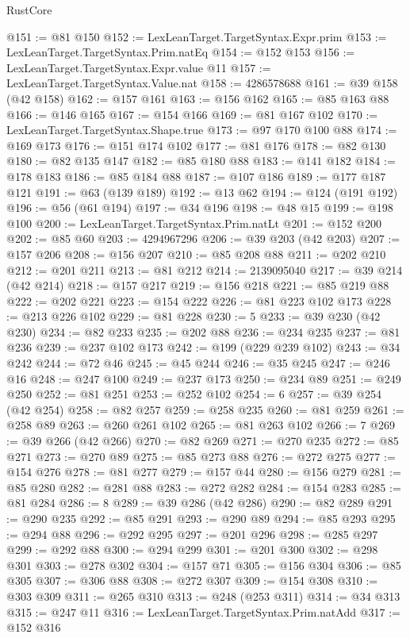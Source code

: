\begin{lexlean}{RustCore}
\begin{coremodule}
@151 := @81 @150
@152 := LexLeanTarget.TargetSyntax.Expr.prim
@153 := LexLeanTarget.TargetSyntax.Prim.natEq
@154 := @152 @153
@156 := LexLeanTarget.TargetSyntax.Expr.value @11
@157 := LexLeanTarget.TargetSyntax.Value.nat
@158 := 4286578688
@161 := @39 @158 (@42 @158)
@162 := @157 @161
@163 := @156 @162
@165 := @85 @163 @88
@166 := @146 @165
@167 := @154 @166
@169 := @81 @167 @102
@170 := LexLeanTarget.TargetSyntax.Shape.true
@173 := @97 @170 @100 @88
@174 := @169 @173
@176 := @151 @174 @102
@177 := @81 @176
@178 := @82 @130
@180 := @82 @135 @147
@182 := @85 @180 @88
@183 := @141 @182
@184 := @178 @183
@186 := @85 @184 @88
@187 := @107 @186
@189 := @177 @187 @121
@191 := @63 (@139 @189)
@192 := @13 @62
@194 := @124 (@191 @192)
@196 := @56 (@61 @194)
@197 := @34 @196
@198 := @48 @15
@199 := @198 @100
@200 := LexLeanTarget.TargetSyntax.Prim.natLt
@201 := @152 @200
@202 := @85 @60
@203 := 4294967296
@206 := @39 @203 (@42 @203)
@207 := @157 @206
@208 := @156 @207
@210 := @85 @208 @88
@211 := @202 @210
@212 := @201 @211
@213 := @81 @212
@214 := 2139095040
@217 := @39 @214 (@42 @214)
@218 := @157 @217
@219 := @156 @218
@221 := @85 @219 @88
@222 := @202 @221
@223 := @154 @222
@226 := @81 @223 @102 @173
@228 := @213 @226 @102
@229 := @81 @228
@230 := 5
@233 := @39 @230 (@42 @230)
@234 := @82 @233
@235 := @202 @88
@236 := @234 @235
@237 := @81 @236
@239 := @237 @102 @173
@242 := @199 (@229 @239 @102)
@243 := @34 @242
@244 := @72 @46
@245 := @45 @244
@246 := @35 @245
@247 := @246 @16
@248 := @247 @100
@249 := @237 @173
@250 := @234 @89
@251 := @249 @250
@252 := @81 @251
@253 := @252 @102
@254 := 6
@257 := @39 @254 (@42 @254)
@258 := @82 @257
@259 := @258 @235
@260 := @81 @259
@261 := @258 @89
@263 := @260 @261 @102
@265 := @81 @263 @102
@266 := 7
@269 := @39 @266 (@42 @266)
@270 := @82 @269
@271 := @270 @235
@272 := @85 @271
@273 := @270 @89
@275 := @85 @273 @88
@276 := @272 @275
@277 := @154 @276
@278 := @81 @277
@279 := @157 @44
@280 := @156 @279
@281 := @85 @280
@282 := @281 @88
@283 := @272 @282
@284 := @154 @283
@285 := @81 @284
@286 := 8
@289 := @39 @286 (@42 @286)
@290 := @82 @289
@291 := @290 @235
@292 := @85 @291
@293 := @290 @89
@294 := @85 @293
@295 := @294 @88
@296 := @292 @295
@297 := @201 @296
@298 := @285 @297
@299 := @292 @88
@300 := @294 @299
@301 := @201 @300
@302 := @298 @301
@303 := @278 @302
@304 := @157 @71
@305 := @156 @304
@306 := @85 @305
@307 := @306 @88
@308 := @272 @307
@309 := @154 @308
@310 := @303 @309
@311 := @265 @310
@313 := @248 (@253 @311)
@314 := @34 @313
@315 := @247 @11
@316 := LexLeanTarget.TargetSyntax.Prim.natAdd
@317 := @152 @316

\end{coremodule}
\end{lexlean}
